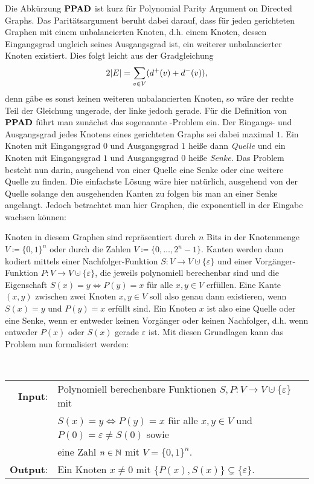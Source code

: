 Die Abkürzung $\textbf{PPAD}$ ist kurz für \glqq Polynomial Parity Argument on Directed Graphs\grqq.
Das Paritätsargument beruht dabei darauf, dass für jeden gerichteten Graphen mit einem unbalancierten Knoten, d.h. einem Knoten, dessen Eingangsgrad ungleich seines Ausgangsgrad ist, ein weiterer unbalancierter Knoten existiert.
Dies folgt leicht aus der Gradgleichung
\[
	2 \lvert E\rvert = \sum_{v\in V} ( d^+(v) + d^-(v) ),
\]
denn gäbe es sonst keinen weiteren unbalancierten Knoten, so wäre der rechte Teil der Gleichung ungerade, der linke jedoch gerade.
Für die Definition von~$\textbf{PPAD}$ führt man zunächst das sogenannte \EndOfTheLine-Problem ein.
Der Eingangs- und Ausgangsgrad jedes Knotens eines gerichteten Graphs sei dabei maximal $1$.
Ein Knoten mit Eingangsgrad $0$ und Ausgangsgrad $1$ heiße dann \emph{Quelle} und ein Knoten mit Eingangsgrad $1$ und Ausgangsgrad $0$ heiße \emph{Senke}.
Das Problem besteht nun darin, ausgehend von einer Quelle eine Senke oder eine weitere Quelle zu finden.
Die einfachste Lösung wäre hier natürlich, ausgehend von der Quelle solange den ausgehenden Kanten zu folgen bis man an einer Senke angelangt.
Jedoch betrachtet man hier Graphen, die exponentiell in der Eingabe wachsen können:

Knoten in diesem Graphen sind repräsentiert durch $n$ Bits in der Knotenmenge $V\coloneq \{ 0,1 \}^n$ oder durch die Zahlen $V \coloneq \{ 0, \dots, 2^n -1 \}$.
Kanten werden dann kodiert mittels einer Nachfolger-Funktion $S: V\rightarrow V\cupdot \{ \varepsilon \}$ und einer Vorgänger-Funktion $P: V\rightarrow V \cupdot \{ \varepsilon \}$, die jeweils polynomiell berechenbar sind und die Eigenschaft $S(x) = y \Leftrightarrow P(y) = x$ für alle $x,y \in V$ erfüllen.
Eine Kante $(x,y)$ zwischen zwei Knoten $x,y \in V$ soll also genau dann existieren, wenn $S(x) = y$ und $P(y) = x$ erfüllt sind.
Ein Knoten $x$ ist also eine Quelle oder eine Senke, wenn er entweder keinen Vorgänger oder keinen Nachfolger, d.h. wenn entweder $P(x)$ oder $S(x)$ gerade $\varepsilon$ ist.
Mit diesen Grundlagen kann das Problem nun formalisiert werden:
\begin{center}
	\begin{mdframed}
		\centering
		\emph{\EndOfTheLine} \\[1em]
		\begin{tabular}{rl}
			{\bfseries Input}: &Polynomiell berechenbare Funktionen $S,P: V\rightarrow V\cupdot \{ \varepsilon \}$ mit\\
			& $S(x) = y \Leftrightarrow P(y) = x$ für alle $x,y \in V$ und
			$P(0) = \varepsilon \neq S(0)$ sowie \\
			& eine Zahl $n\in\mathbb{N}$ mit $V = \{ 0, 1 \}^n$.\\
			{\bfseries Output}: & Ein Knoten $x\neq 0$ mit $\{ P(x), S(x) \} \subsetneq \{ \varepsilon \}$.
		\end{tabular}
	\end{mdframed}
\end{center}

